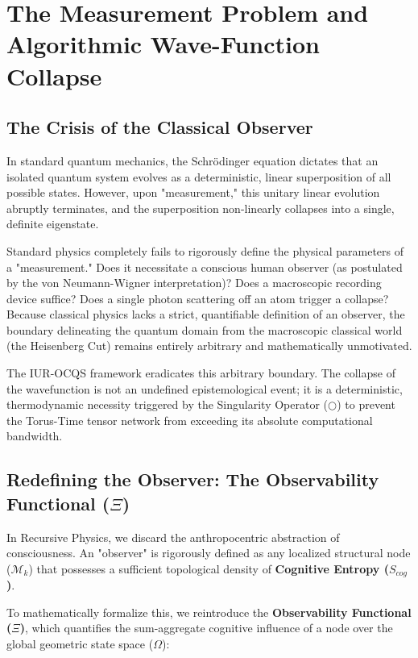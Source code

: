 \documentclass[12pt,openany]{book}
\begin{document}
\chapter{The Measurement Problem and Algorithmic Wave-Function Collapse}

\section{The Crisis of the Classical Observer}
In standard quantum mechanics, the Schr\"{o}dinger equation dictates that an isolated quantum system evolves as a deterministic, linear superposition of all possible states. However, upon "measurement," this unitary linear evolution abruptly terminates, and the superposition non-linearly collapses into a single, definite eigenstate. 

Standard physics completely fails to rigorously define the physical parameters of a "measurement." Does it necessitate a conscious human observer (as postulated by the von Neumann-Wigner interpretation)? Does a macroscopic recording device suffice? Does a single photon scattering off an atom trigger a collapse? Because classical physics lacks a strict, quantifiable definition of an observer, the boundary delineating the quantum domain from the macroscopic classical world (the Heisenberg Cut) remains entirely arbitrary and mathematically unmotivated.

The IUR-OCQS framework eradicates this arbitrary boundary. The collapse of the wavefunction is not an undefined epistemological event; it is a deterministic, thermodynamic necessity triggered by the Singularity Operator ($\bigcirc$) to prevent the Torus-Time tensor network from exceeding its absolute computational bandwidth.

\section{Redefining the Observer: The Observability Functional ($\Xi$)}
In Recursive Physics, we discard the anthropocentric abstraction of consciousness. An "observer" is rigorously defined as any localized structural node ($\mathcal{M}_k$) that possesses a sufficient topological density of \textbf{Cognitive Entropy ($S_{cog}$)}. 

To mathematically formalize this, we reintroduce the \textbf{Observability Functional ($\Xi$)}, which quantifies the sum-aggregate cognitive influence of a node over the global geometric state space ($\Omega$):
\end{document}
